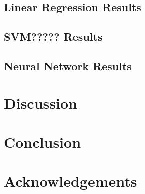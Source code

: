 \documentclass[11pt]{article}
\begin{document}
\subsection{Linear Regression Results}


\subsection{SVM????? Results}


\subsection{Neural Network Results}


\section{Discussion}


\section{Conclusion}


\section*{Acknowledgements}







\end{document}
